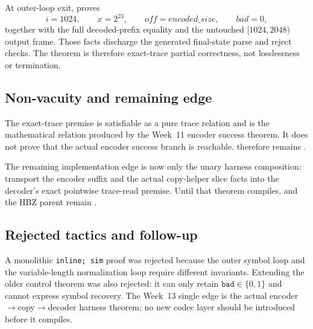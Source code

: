 At outer-loop exit,  proves
\[
  i=1024,\qquad x=2^{23},\qquad off=\mathit{encoded\_size},\qquad
  bad=0,
\]
together with the full decoded-prefix equality and the untouched
\([1024,2048)\) output frame.  Those facts discharge the generated final-state
parse and reject checks.  The theorem is therefore exact-trace partial
correctness, not losslessness or termination.

\subsection*{Non-vacuity and remaining edge}

The exact-trace premise is satisfiable as a pure trace relation and is the
mathematical relation produced by the Week~11 encoder success theorem.  It
does not prove that the actual encoder success branch is reachable.
 therefore remains
.

The remaining implementation edge is now only the unary harness composition:
transport the encoder suffix and the actual copy-helper slice facts into the
decoder's exact pointwise trace-read premise.  Until that theorem compiles,
 and the HBZ parent remain
.

\subsection*{Rejected tactics and follow-up}

A monolithic \texttt{inline; sim} proof was rejected because the outer symbol
loop and the variable-length normalization loop require different invariants.
Extending the older control theorem was also rejected: it can only retain
\(\texttt{bad}\in\{0,1\}\) and cannot express symbol recovery.  The Week~13
single edge is the actual encoder\(\rightarrow\)copy\(\rightarrow\)decoder
harness theorem; no new codec layer should be introduced before it compiles.
